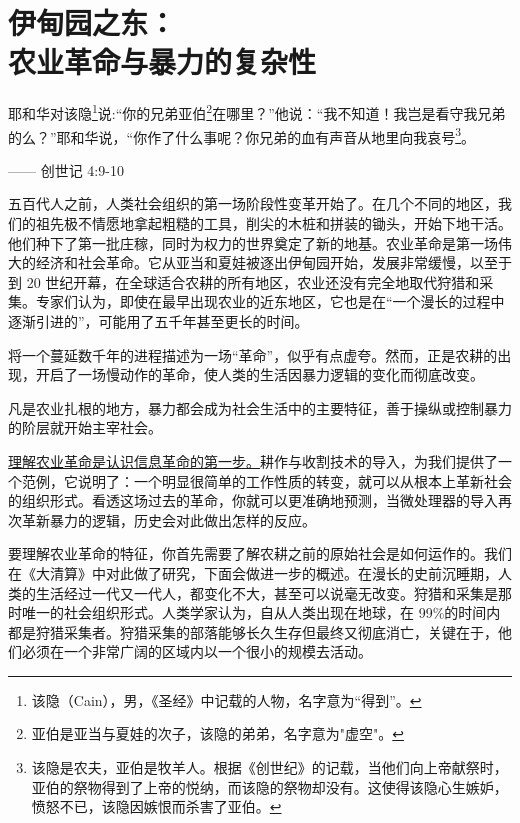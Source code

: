 \chapter[伊甸园之东]{伊甸园之东：\\ 农业革命与暴力的复杂性}

\begin{tcolorbox}
\kaishu 耶和华对该隐\footnote{该隐（Cain），男，《圣经》中记载的人物，名字意为“得到”。}说:“你的兄弟亚伯\footnote{亚伯是亚当与夏娃的次子，该隐的弟弟，名字意为"虚空"。}在哪里？”他说：“我不知道！我岂是看守我兄弟的么？”耶和华说，“你作了什么事呢？你兄弟的血有声音从地里向我哀号\footnote{该隐是农夫，亚伯是牧羊人。根据《创世纪》的记载，当他们向上帝献祭时，亚伯的祭物得到了上帝的悦纳，而该隐的祭物却没有。这使得该隐心生嫉妒，愤怒不已，该隐因嫉恨而杀害了亚伯。}。
\begin{flushright}
—— 创世记 4:9-10 
\end{flushright}
\end{tcolorbox}

五百代人之前，人类社会组织的第一场阶段性变革开始了。在几个不同的地区，我们的祖先极不情愿地拿起粗糙的工具，削尖的木桩和拼装的锄头，开始下地干活。他们种下了第一批庄稼，同时为权力的世界奠定了新的地基。农业革命是第一场伟大的经济和社会革命。它从亚当和夏娃被逐出伊甸园开始，发展非常缓慢，以至于到 20 世纪开幕，在全球适合农耕的所有地区，农业还没有完全地取代狩猎和采集。专家们认为，即使在最早出现农业的近东地区，它也是在“一个漫长的过程中逐渐引进的”，可能用了五千年甚至更长的时间。

将一个蔓延数千年的进程描述为一场“革命”，似乎有点虚夸。然而，正是农耕的出现，开启了一场慢动作的革命，使人类的生活因暴力逻辑的变化而彻底改变。

凡是农业扎根的地方，暴力都会成为社会生活中的主要特征，善于操纵或控制暴力的阶层就开始主宰社会。

\uline{理解农业革命是认识信息革命的第一步。}耕作与收割技术的导入，为我们提供了一个范例，它说明了：一个明显很简单的工作性质的转变，就可以从根本上革新社会的组织形式。看透这场过去的革命，你就可以更准确地预测，当微处理器的导入再次革新暴力的逻辑，历史会对此做出怎样的反应。

要理解农业革命的特征，你首先需要了解农耕之前的原始社会是如何运作的。我们在《大清算》中对此做了研究，下面会做进一步的概述。在漫长的史前沉睡期，人类的生活经过一代又一代人，都变化不大，甚至可以说毫无改变。狩猎和采集是那时唯一的社会组织形式。人类学家认为，自从人类出现在地球，在 99\%的时间内都是狩猎采集者。狩猎采集的部落能够长久生存但最终又彻底消亡，关键在于，他们必须在一个非常广阔的区域内以一个很小的规模去活动。

